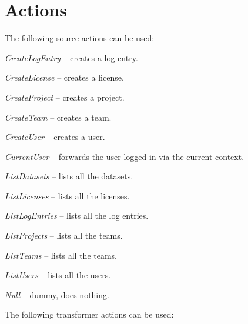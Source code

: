 \documentclass[a4paper]{book}
\begin{document}
\section{Actions}
The following source actions can be used:
\begin{tight_itemize}
  \item \textit{CreateLogEntry} -- creates a log entry.
  \item \textit{CreateLicense} -- creates a license.
  \item \textit{CreateProject} -- creates a project.
  \item \textit{CreateTeam} -- creates a team.
  \item \textit{CreateUser} -- creates a user.
  \item \textit{CurrentUser} -- forwards the user logged in via the current context.
  \item \textit{ListDatasets} -- lists all the datasets.
  \item \textit{ListLicenses} -- lists all the licenses.
  \item \textit{ListLogEntries} -- lists all the log entries.
  \item \textit{ListProjects} -- lists all the teams.
  \item \textit{ListTeams} -- lists all the teams.
  \item \textit{ListUsers} -- lists all the users.
  \item \textit{Null} -- dummy, does nothing.
\end{tight_itemize}
The following transformer actions can be used:
\end{document}
